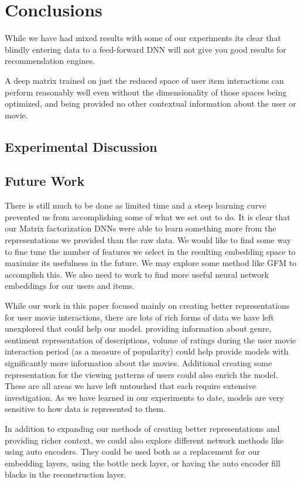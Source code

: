 \section{Conclusions}

While we have had mixed results with some of our experiments its clear that blindly entering data to a feed-forward DNN will not give you good results for recommendation engines.

A deep matrix trained on just the reduced space of user item interactions can perform reasonably well even without the dimensionality of those spaces being optimized, and being provided no other contextual information about the user or movie.

\subsection{Experimental Discussion}
\subsection{Future Work}

There is still much to be done as limited time and a steep learning curve prevented us from accomplishing some of what we set out to do. It is clear that our Matrix factorization DNNs were able to learn something more from the representations we provided than the raw data. We would like to find some way to fine tune the number of features we select in the resulting embedding space to maximize its usefulness in the future. We may explore some method like GFM to accomplish this. We also need to work to find more useful neural network embeddings for our users and items.

While our work in this paper focused mainly on creating better representations for user movie interactions, there are lots of rich forms of data we have left unexplored that could help our model. providing information about genre, sentiment representation of descriptions, volume of ratings during the user movie interaction period (as a measure of popularity) could help provide models with significantly more information about the movies. Additional creating some representation for the viewing patterns of users could also enrich the model. These are all areas we have left untouched that each require extensive investigation. As we have learned in our experiments to date, models are very sensitive to how data is represented to them.

In addition to expanding our methods of creating better representations and providing richer context, we could also explore different network methods like using auto encoders. They could be used both as a replacement for our embedding layers, using the bottle neck layer, or having the auto encoder fill blacks in the reconstruction layer.